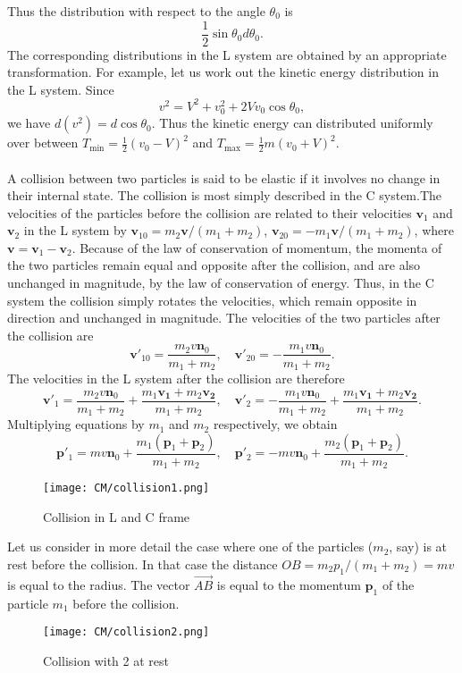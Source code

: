 Thus the distribution with respect to the angle $\theta_0$ is
\[\frac{1}{2}\sin\theta_0 d\theta_0.\]
The corresponding distributions in the L system are obtained by an appropriate transformation. For example, let us work out the kinetic energy distribution in the L system.
Since
\[v^2 = V^2 + v_0^2 + 2Vv_0\cos\theta_0,\] 
we have $d(v^2) = d\cos\theta_0$. Thus the kinetic energy can distributed uniformly over between $T_{\mathrm{min}} = \frac{1}{2}(v_0-V)^2$ and $T_{\mathrm{max}}= \frac{1}{2}m(v_0+V)^2$.
\\ \\
A collision between two particles is said to be elastic if it involves no change in their internal state. The collision is most simply described in the C system.The velocities of the particles before the collision are related to their velocities $\bm{v}_1$ and
$\bm{v}_2$ in the L system by $\bm{v}_{10} = m_2\bm{v}/(m_1+m_2)$, $\bm{v}_{20} = -m_1\bm{v}/(m_1+m_2)$,
where $\bm{v} = \bm{v}_1-\bm{v}_2$.
Because of the law of conservation of momentum, the momenta of the two particles remain equal and opposite after the collision, and are also unchanged in magnitude, by the law of conservation of energy. 
Thus, in the C system the collision simply rotates the velocities, which remain opposite in direction and unchanged in magnitude. The velocities of the two particles after the collision are
\[\bm{v}'_{10} = \frac{m_2v\bm{n}_0}{m_1+m_2}, \quad \bm{v}'_{20} = -\frac{m_1v\bm{n}_0}{m_1+m_2}.\]
The velocities in the L system after the collision are therefore
\[\bm{v}'_{1} = \frac{m_2v\bm{n}_0}{m_1+m_2} + \frac{m_1\bm{v_1}+m_2\bm{v_2}}{m_1+m_2}, \quad \bm{v}'_{2} = -\frac{m_1v\bm{n}_0}{m_1+m_2} + \frac{m_1\bm{v_1}+m_2\bm{v_2}}{m_1+m_2}.\]
Multiplying equations by $m_1$ and $m_2$ respectively, we obtain
\[\bm{p}'_{1} = mv\bm{n}_0 + \frac{m_1(\bm{p}_1 + \bm{p}_2)}{m_1+m_2}, \quad \bm{p}'_{2} = -mv\bm{n}_0 + \frac{m_2(\bm{p}_1 + \bm{p}_2)}{m_1+m_2}.\]
\begin{figure}[!h]
	\centering
	\texttt{[image: CM/collision1.png]}
	\caption{Collision in L and C frame}
\end{figure}
\noindent
Let us consider in more detail the case where one of the particles ($m_2$, say) is at rest before the collision. In that case the distance $OB = {m_2p_1}/{(m_1+m_2)} = mv$ is equal to the radius. The vector $\vec{AB}$ is equal to the momentum $\bm{p}_1$ of the particle $m_1$ before the collision.
\begin{figure}[!h]
	\centering
	\texttt{[image: CM/collision2.png]}
	\caption{Collision with 2 at rest}
\end{figure}
